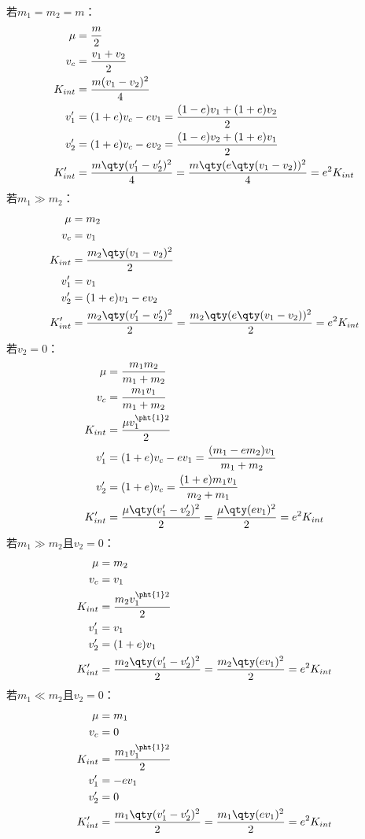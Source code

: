 \documentclass[a4paper,12pt]{article}
\begin{document}
若$m_1=m_2=m$：
\[\begin{aligned}
\mu&=\frac{m}{2}\\
v_c &= \frac{v_1+v_2}{2} \\
K_{int} &= \frac{m(v_1-v_2)^2}{4}\\
v_1' &= (1+e)v_c - ev_1 = \frac{(1-e)v_1+(1+e)v_2}{2} \\
v_2' &= (1+e)v_c - ev_2 = \frac{(1-e)v_2+(1+e)v_1}{2} \\
K_{int}' &= \frac{m\qty(v_1'-v_2')^2}{4} = \frac{m\qty(e\qty(v_1-v_2))^2}{4} = e^2K_{int}
\end{aligned}\]
若$m_1\gg m_2$：
\[\begin{aligned}
\mu&=m_2\\
v_c &= v_1 \\
K_{int} &= \frac{m_2\qty(v_1-v_2)^2}{2}\\
v_1' &= v_1 \\
v_2' &= (1+e)v_1 - ev_2 \\
K_{int}' &= \frac{m_2\qty(v_1'-v_2')^2}{2} = \frac{m_2\qty(e\qty(v_1-v_2))^2}{2} = e^2K_{int}
\end{aligned}\]
若$v_2=0$：
\[\begin{aligned}
\mu&=\frac{m_1m_2}{m_1+m_2}\\
v_c &= \frac{m_1v_1}{m_1+m_2} \\
K_{int} &= \frac{\mu v_1^{\pht{1}2}}{2}\\
v_1' &= (1+e)v_c - ev_1 = \frac{(m_1-em_2)v_1}{m_1+m_2} \\
v_2' &= (1+e)v_c = \frac{(1+e)m_1v_1}{m_2+m_1} \\
K_{int}' &= \frac{\mu \qty(v_1'-v_2')^2}{2} = \frac{\mu \qty(ev_1)^2}{2} = e^2K_{int}
\end{aligned}\]
若$m_1\gg m_2$且$v_2=0$：
\[\begin{aligned}
\mu&=m_2\\
v_c &= v_1 \\
K_{int} &= \frac{m_2v_1^{\pht{1}2}}{2}\\
v_1' &= v_1 \\
v_2' &= (1+e)v_1 \\
K_{int}' &= \frac{m_2 \qty(v_1'-v_2')^2}{2} = \frac{m_2 \qty(ev_1)^2}{2} = e^2K_{int}
\end{aligned}\]
若$m_1\ll m_2$且$v_2=0$：
\[\begin{aligned}
\mu&=m_1\\
v_c &= 0 \\
K_{int} &= \frac{m_1v_1^{\pht{1}2}}{2}\\
v_1' &= -ev_1 \\
v_2' &= 0 \\
K_{int}' &= \frac{m_1\qty(v_1'-v_2')^2}{2} = \frac{m_1\qty(ev_1)^2}{2} = e^2K_{int}
\end{aligned}\]
\end{document}

